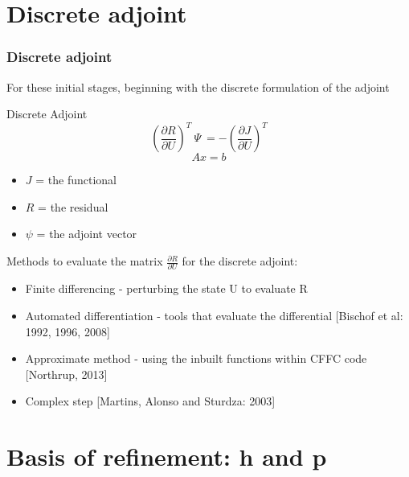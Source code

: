 \documentclass{beamer}
\begin{document}

\section{Discrete adjoint}
\begin{frame}
\frametitle{Discrete adjoint}
\scriptsize
For these initial stages, beginning with the discrete formulation of the adjoint
\begin{minipage}[t][0.6\textheight]{1\textwidth}
\scriptsize
\vspace{-10pt}
\begin{exampleblock}{Discrete Adjoint}
\[\left( \frac{\partial{R}}{\partial{U}} \right)^T ~\Psi~ = -\left( \frac{\partial{J}}{\partial{U}} \right)^T\]
\vspace{-10pt}
\[Ax = b\]
\vspace{-10pt}
\vspace{10pt}
\begin{itemize}
\item \textbf{$J$} = the functional
\item \textbf{$R$} =  the residual
\item \textbf{$\psi$} = the adjoint vector
\end{itemize}
\end{exampleblock}
\end{minipage}

Methods to evaluate the matrix $\frac{\partial{R}}{\partial{U}} $  for the discrete adjoint:
\begin{itemize}
\scriptsize
\item Finite differencing - perturbing the state U to evaluate R 
\item Automated differentiation - tools that evaluate the differential [Bischof et al: 1992, 1996, 2008]
\item Approximate method  - using the inbuilt functions within CFFC code [Northrup, 2013]
\item Complex step [Martins, Alonso and Sturdza: 2003]
\end{itemize}


\end{frame}



\section[$\Psi$ with h]{Basis of refinement: h and p}
\end{document}
